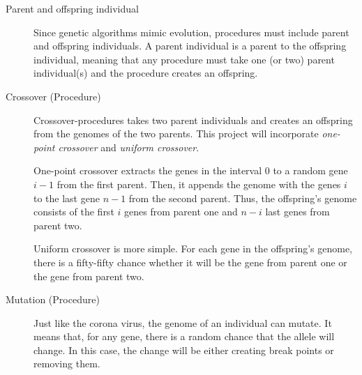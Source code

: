 \begin{description}
    \item[Parent and offspring individual] Since genetic algorithms mimic
    evolution, procedures must include parent and offspring individuals. A
    parent individual is a parent to the offspring individual, meaning that any
    procedure must take one (or two) parent individual(s) and the procedure
    creates an offspring. 

    \item[Crossover (Procedure)] Crossover-procedures takes two parent
    individuals and creates an offspring from the genomes of the two parents.
    This project will incorporate \textit{one-point crossover} and
    \textit{uniform crossover}. 
    
    One-point crossover extracts the genes in the interval $0$ to a random gene
    $i - 1$ from the first parent. Then, it appends the genome with the genes
    $i$ to the last gene $n - 1$ from the second parent. Thus, the offspring's
    genome consists of the first $i$ genes from parent one and $n-i$ last genes
    from parent two. 

    Uniform crossover is more simple. For each gene in the offspring's genome,
    there is a fifty-fifty chance whether it will be the gene from parent one or
    the gene from parent two. 

    \item[Mutation (Procedure)] Just like the corona virus, the genome of an
    individual can mutate. It means that, for any gene, there is a random chance
    that the allele will change. In this case, the change will be either
    creating break points or removing them. 

\end{description}
